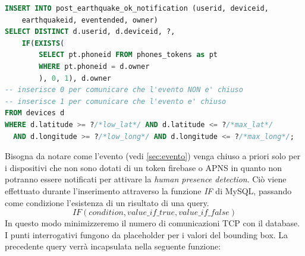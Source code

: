 \documentclass[main.tex]{subfiles}
\begin{document}
\begin{lstlisting}[language=SQL]
INSERT INTO post_earthquake_ok_notification (userid, deviceid, 
    earthquakeid, eventended, owner)
SELECT DISTINCT d.userid, d.deviceid, ?, 
    IF(EXISTS(
        SELECT pt.phoneid FROM phones_tokens as pt 
        WHERE pt.phoneid = d.owner
        ), 0, 1), d.owner 
-- inserisce 0 per comunicare che l'evento NON e' chiuso
-- inserisce 1 per comunicare che l'evento e' chiuso
FROM devices d
WHERE d.latitude >= ?/*low_lat*/ AND d.latitude <= ?/*max_lat*/
  AND d.longitude >= ?/*low_long*/ AND d.longitude <= ?/*max_long*/;
\end{lstlisting}
Bisogna da notare come l'evento (vedi \ref{sec:evento}) venga chiuso a priori solo per i dispositivi che non sono dotati di un token firebase o APNS in quanto non potranno essere notificati per attivare la \emph{human presence detection}. Ciò viene effettuato durante l'inserimento attraverso la funzione \emph{IF} di MySQL, passando come condizione l'esistenza di un risultato di una query.
\[IF(condition, value\_if\_true, value\_if\_false)\]
In questo modo minimizzeremo il numero di comunicazioni TCP con il database.
I punti interrogativi fungono da placeholder per i valori del bounding box.\newline
La precedente query verrà incapsulata nella seguente funzione:

\end{document}
